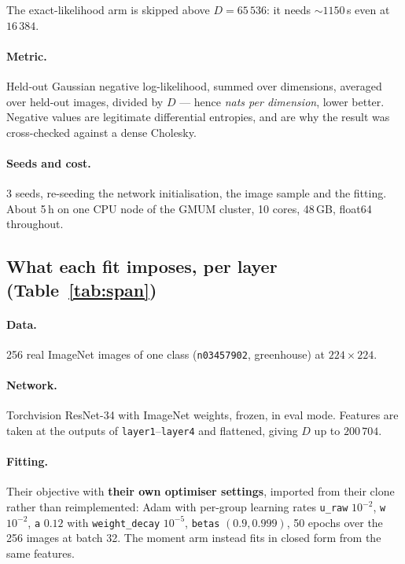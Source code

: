 \documentclass[11pt,a4paper]{article}
\newcommand{\code}[1]{\texttt{#1}}
\begin{document}
\noindent
The exact-likelihood arm is skipped above $D = 65\,536$: it needs ${\sim}1150$\,s even at
$16\,384$.

\paragraph{Metric.} Held-out Gaussian negative log-likelihood, summed over dimensions, averaged
over held-out images, divided by $D$ --- hence \emph{nats per dimension}, lower better.
Negative values are legitimate differential entropies, and are why the result was
cross-checked against a dense Cholesky.

\paragraph{Seeds and cost.} 3 seeds, re-seeding the network initialisation, the image sample and
the fitting. About 5\,h on one CPU node of the GMUM cluster, 10 cores, 48\,GB, float64
throughout.

\subsection{What each fit imposes, per layer (Table~\ref{tab:span})}

\paragraph{Data.} 256 real ImageNet images of one class (\code{n03457902}, greenhouse) at
$224 \times 224$.

\paragraph{Network.} Torchvision ResNet-34 with ImageNet weights, frozen, in eval mode.
Features are taken at the outputs of \code{layer1}--\code{layer4} and flattened, giving $D$ up
to $200\,704$.

\paragraph{Fitting.} Their objective with \textbf{their own optimiser settings}, imported from
their clone rather than reimplemented: Adam with per-group learning rates \code{u\_raw}
$10^{-2}$, \code{w} $10^{-2}$, \code{a} $0.12$ with \code{weight\_decay} $10^{-5}$,
\code{betas} $(0.9, 0.999)$, 50 epochs over the 256 images at batch 32. The moment arm instead
fits in closed form from the same features.
\end{document}
